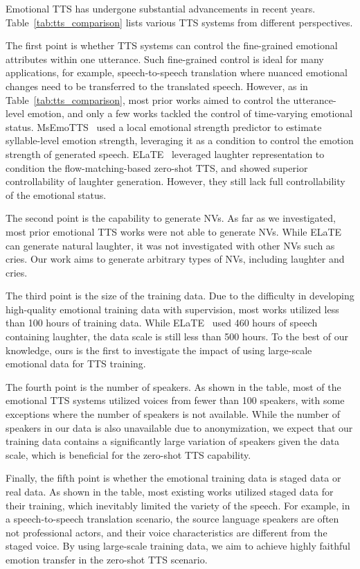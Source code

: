 Emotional TTS has undergone substantial advancements in recent years. Table~\ref{tab:tts_comparison} lists various TTS systems from different perspectives.

The first point is whether TTS systems can control the fine-grained emotional attributes within one utterance. Such fine-grained control is ideal for many applications, for example, speech-to-speech translation where nuanced emotional changes need to be transferred to the translated speech. However, as in Table~\ref{tab:tts_comparison}, most prior works aimed to control the utterance-level emotion, and only a few works tackled the control of time-varying emotional status. MsEmoTTS~\cite{lei2022msemotts} used a local emotional strength predictor to estimate syllable-level emotion strength, leveraging it as a condition to control the emotion strength of generated speech. ELaTE~\cite{kanda2024making} leveraged laughter representation to condition the flow-matching-based zero-shot TTS, and showed superior controllability of laughter generation. However, they still lack full controllability of the emotional status.

The second point is the capability to generate NVs. As far as we investigated, most prior emotional TTS works were not able to generate NVs. While ELaTE~\cite{kanda2024making} can generate natural laughter, it was not investigated with other NVs such as cries. Our work aims to generate arbitrary types of NVs, including laughter and cries.

The third point is the size of the training data. Due to the difficulty in developing high-quality emotional training data with supervision, most works utilized less than 100 hours of training data. While ELaTE~\cite{kanda2024making} used 460 hours of speech containing laughter, the data scale is still less than 500 hours. To the best of our knowledge, ours is the first to investigate the impact of using large-scale emotional data for TTS training.

The fourth point is the number of speakers. As shown in the table, most of the emotional TTS systems utilized voices from fewer than 100 speakers, with some exceptions where the number of speakers is not available. While the number of speakers in our data is also unavailable due to anonymization, we expect that our training data contains a significantly large variation of speakers given the data scale, which is beneficial for the zero-shot TTS capability.

Finally, the fifth point is whether the emotional training data is staged data or real data. As shown in the table, most existing works utilized staged data for their training, which inevitably limited the variety of the speech. For example, in a speech-to-speech translation scenario, the source language speakers are often not professional actors, and their voice characteristics are different from the staged voice. By using large-scale training data, we aim to achieve highly faithful emotion transfer in the zero-shot TTS scenario.

